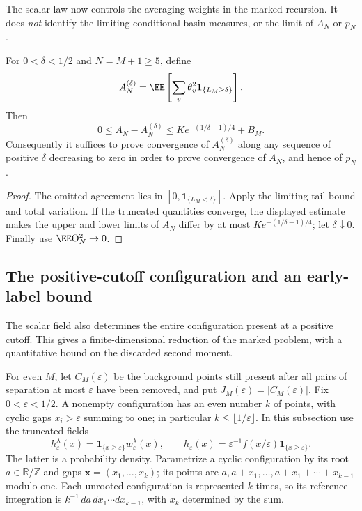 \documentclass[11pt,letterpaper]{article}
\newcommand{\T}{\mathbb R/\mathbb Z}\newcommand{\Leb}{\operatorname{Leb}}
\newcommand{\ind}{\mathbf 1}\newcommand{\Exp}{\operatorname{Exp}}
\begin{document}
The scalar law now controls the averaging weights in the marked recursion.
It does \emph{not} identify the limiting conditional basin measures, or
the limit of $A_N$ or $p_N$.

\begin{corollary}\label{cor:truncation}
For $0<\delta<1/2$ and $N=M+1\ge5$, define
\[
 A_N^{(\delta)}=\EE\left[\sum_v\theta_v^2
                            \ind_{\{L_M\ge\delta\}}\right].
\]
Then
\begin{equation}\label{eq:truncation}
 0\le A_N-A_N^{(\delta)}
 \le K e^{-(1/\delta-1)/4}+B_M.
\end{equation}
Consequently it suffices to prove convergence of $A_N^{(\delta)}$ along
any sequence of positive $\delta$ decreasing to zero in order to prove
convergence of $A_N$, and hence of $p_N$.
\end{corollary}
\begin{proof}
The omitted agreement lies in $[0,\ind_{\{L_M<\delta\}}]$.
Apply the limiting tail bound and total variation. If the truncated
quantities converge, the displayed estimate makes the upper and lower
limits of $A_N$ differ by at most $K e^{-(1/\delta-1)/4}$; let
$\delta\downarrow0$. Finally use $\EE\Theta_N^2\to0$.
\end{proof}

\subsection{The positive-cutoff configuration and an early-label bound}
\label{sec:active-limit}

The scalar field also determines the entire configuration present at a
positive cutoff. This gives a finite-dimensional reduction of the marked
problem, with a quantitative bound on the discarded second moment.

For even $M$, let $C_M(\varepsilon)$ be the background points still
present after all pairs of separation at most $\varepsilon$ have been
removed, and put $J_M(\varepsilon)=|C_M(\varepsilon)|$. Fix
$0<\varepsilon<1/2$. A nonempty configuration has an even number $k$ of
points, with cyclic gaps $x_i>\varepsilon$ summing to one; in particular
$k\le\lfloor1/\varepsilon\rfloor$. In this subsection use the truncated
fields
\[
 h_\varepsilon^\lambda(x)=\ind_{\{x\ge\varepsilon\}}
                  w_\varepsilon^\lambda(x),\qquad
 h_\varepsilon(x)=\varepsilon^{-1}f(x/\varepsilon)
                  \ind_{\{x\ge\varepsilon\}}.
\]
The latter is a probability density. Parametrize a cyclic configuration
by its root $a\in\T$ and gaps $\mathbf x=(x_1,\ldots,x_k)$; its points
are $a,a+x_1,\ldots,a+x_1+\cdots+x_{k-1}$ modulo one. Each unrooted
configuration is represented $k$ times, so its reference integration is
$k^{-1}\,da\,dx_1\cdots dx_{k-1}$, with $x_k$ determined by the sum.
\end{document}
